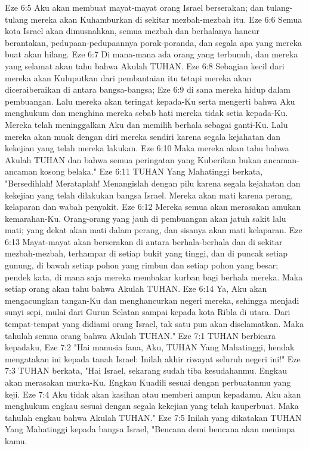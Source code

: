 Eze 6:5  Aku akan membuat mayat-mayat orang Israel berserakan; dan tulang-tulang mereka akan Kuhamburkan di sekitar mezbah-mezbah itu.
Eze 6:6  Semua kota Israel akan dimusnahkan, semua mezbah dan berhalanya hancur berantakan, pedupaan-pedupaannya porak-poranda, dan segala apa yang mereka buat akan hilang.
Eze 6:7  Di mana-mana ada orang yang terbunuh, dan mereka yang selamat akan tahu bahwa Akulah TUHAN.
Eze 6:8  Sebagian kecil dari mereka akan Kuluputkan dari pembantaian itu tetapi mereka akan diceraiberaikan di antara bangsa-bangsa;
Eze 6:9  di sana mereka hidup dalam pembuangan. Lalu mereka akan teringat kepada-Ku serta mengerti bahwa Aku menghukum dan menghina mereka sebab hati mereka tidak setia kepada-Ku. Mereka telah meninggalkan Aku dan memilih berhala sebagai ganti-Ku. Lalu mereka akan muak dengan diri mereka sendiri karena segala kejahatan dan kekejian yang telah mereka lakukan.
Eze 6:10  Maka mereka akan tahu bahwa Akulah TUHAN dan bahwa semua peringatan yang Kuberikan bukan ancaman-ancaman kosong belaka."
Eze 6:11  TUHAN Yang Mahatinggi berkata, "Bersedihlah! Merataplah! Menangislah dengan pilu karena segala kejahatan dan kekejian yang telah dilakukan bangsa Israel. Mereka akan mati karena perang, kelaparan dan wabah penyakit.
Eze 6:12  Mereka semua akan merasakan amukan kemarahan-Ku. Orang-orang yang jauh di pembuangan akan jatuh sakit lalu mati; yang dekat akan mati dalam perang, dan sisanya akan mati kelaparan.
Eze 6:13  Mayat-mayat akan berserakan di antara berhala-berhala dan di sekitar mezbah-mezbah, terhampar di setiap bukit yang tinggi, dan di puncak setiap gunung, di bawah setiap pohon yang rimbun dan setiap pohon yang besar; pendek kata, di mana saja mereka membakar kurban bagi berhala mereka. Maka setiap orang akan tahu bahwa Akulah TUHAN.
Eze 6:14  Ya, Aku akan mengacungkan tangan-Ku dan menghancurkan negeri mereka, sehingga menjadi sunyi sepi, mulai dari Gurun Selatan sampai kepada kota Ribla di utara. Dari tempat-tempat yang didiami orang Israel, tak satu pun akan diselamatkan. Maka tahulah semua orang bahwa Akulah TUHAN."
Eze 7:1  TUHAN berbicara kepadaku,
Eze 7:2  "Hai manusia fana, Aku, TUHAN Yang Mahatinggi, hendak mengatakan ini kepada tanah Israel: Inilah akhir riwayat seluruh negeri ini!"
Eze 7:3  TUHAN berkata, "Hai Israel, sekarang sudah tiba kesudahanmu. Engkau akan merasakan murka-Ku. Engkau Kuadili sesuai dengan perbuatanmu yang keji.
Eze 7:4  Aku tidak akan kasihan atau memberi ampun kepadamu. Aku akan menghukum engkau sesuai dengan segala kekejian yang telah kauperbuat. Maka tahulah engkau bahwa Akulah TUHAN."
Eze 7:5  Inilah yang dikatakan TUHAN Yang Mahatinggi kepada bangsa Israel, "Bencana demi bencana akan menimpa kamu.
